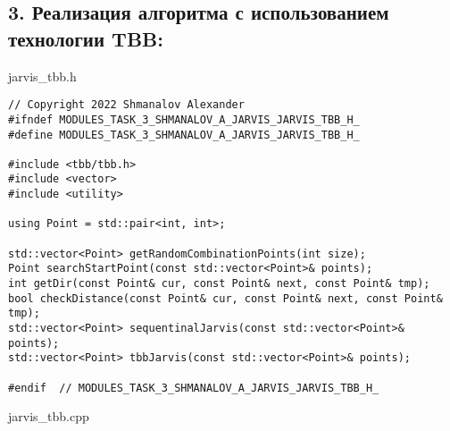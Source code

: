 \documentclass{report}
\begin{document}
\subsection*{3. Реализация алгоритма с использованием технологии TBB:}
\par jarvis\_tbb.h
\begin{lstlisting}
// Copyright 2022 Shmanalov Alexander
#ifndef MODULES_TASK_3_SHMANALOV_A_JARVIS_JARVIS_TBB_H_
#define MODULES_TASK_3_SHMANALOV_A_JARVIS_JARVIS_TBB_H_

#include <tbb/tbb.h>
#include <vector>
#include <utility>

using Point = std::pair<int, int>;

std::vector<Point> getRandomCombinationPoints(int size);
Point searchStartPoint(const std::vector<Point>& points);
int getDir(const Point& cur, const Point& next, const Point& tmp);
bool checkDistance(const Point& cur, const Point& next, const Point& tmp);
std::vector<Point> sequentinalJarvis(const std::vector<Point>& points);
std::vector<Point> tbbJarvis(const std::vector<Point>& points);

#endif  // MODULES_TASK_3_SHMANALOV_A_JARVIS_JARVIS_TBB_H_
\end{lstlisting}
\par jarvis\_tbb.cpp
\end{document}
